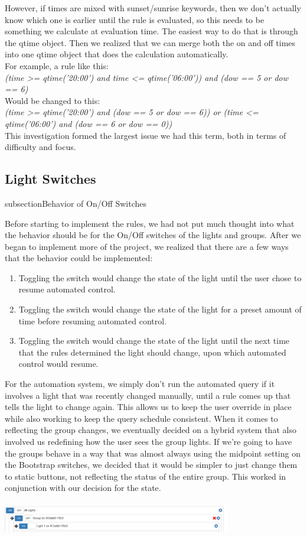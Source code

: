 \documentclass[10pt,draftclsnofoot,onecolumn]{IEEEtran}
\begin{document}
 However, if times are mixed with sunset/sunrise keywords, then we don't actually know which one is earlier until the rule is evaluated, so this needs to be something we calculate at evaluation time. The easiest way to do that is through the qtime object. 
Then we realized that  we can merge both the on and off times into one qtime object that does the calculation automatically.\\
For example, a rule like this:\\
\textit{(time \textgreater= qtime('20:00') and time \textless= qtime('06:00')) and (dow == 5 or dow == 6)}\\
Would be changed to this:\\
\textit{(time \textgreater= qtime('20:00') and (dow == 5 or dow == 6)) or (time \textless= qtime('06:00') and (dow == 6 or dow == 0))}\\
This investigation formed the largest issue we had this term, both in terms of difficulty and focus.
\subsection{Light Switches}
subsection{Behavior of On/Off Switches}

Before starting to implement the rules, we had not put much thought into what
the behavior should be for the On/Off switches of the lights and groups. After
we began to implement more of the project, we realized that there are a few
ways that the behavior could be implemented:

\begin{enumerate}
  \item Toggling the switch would change the state of the light until the user
      chose to resume automated control.
  \item Toggling the switch would change the state of the light for a preset
      amount of time before resuming automated control.
  \item Toggling the switch would change the state of the light until the next
      time that the rules determined the light should change, upon which
      automated control would resume.
\end{enumerate}

For the automation system, we simply don't run the automated query if it involves a 
light that was recently changed manually, until a rule comes up that tells the light
to change again. This allows us to keep the user override in place while also working to
keep the query schedule consistent. When it comes to reflecting the group changes,
we eventually decided on a hybrid system that also involved us redefining how the 
user sees the group lights. If we're going to have the groups behave in a way that was almost
always using the midpoint setting on the Bootstrap switches, we decided that it would be simpler
to just change them to static buttons, not reflecting the status of the entire group. This worked
in conjunction with our decision for the state.\\ \\
\includegraphics[width=0.75\textwidth]{buttons.png}
\end{document}
